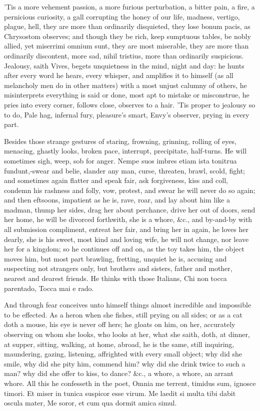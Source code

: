 {'Tis a more vehement passion, a more furious perturbation, a bitter
pain, a fire, a pernicious curiosity, a gall corrupting the honey of
our life, madness, vertigo, plague, hell, they are more than ordinarily
disquieted, they lose bonum pacis, as Chrysostom observes; and
though they be rich, keep sumptuous tables, be nobly allied, yet
miserrimi omnium sunt, they are most miserable, they are more than
ordinarily discontent, more sad, nihil tristius, more than ordinarily
suspicious. Jealousy, saith Vives, begets unquietness in the
mind, night and day: he hunts after every word he hears, every whisper,
and amplifies it to himself (as all melancholy men do in other matters)
with a most unjust calumny of others, he misinterprets everything is
said or done, most apt to mistake or misconstrue, he pries into every
corner, follows close, observes to a hair. 'Tis proper to jealousy so
to do,
Pale hag, infernal fury, pleasure's smart,
Envy's observer, prying in every part.

Besides those strange gestures of staring, frowning, grinning, rolling
of eyes, menacing, ghastly looks, broken pace, interrupt, precipitate,
half-turns. He will sometimes sigh, weep, sob for anger. Nempe suos
imbres etiam ista tonitrua fundunt,-swear and belie, slander any
man, curse, threaten, brawl, scold, fight; and sometimes again flatter
and speak fair, ask forgiveness, kiss and coll, condemn his rashness
and folly, vow, protest, and swear he will never do so again; and then
eftsoons, impatient as he is, rave, roar, and lay about him like a
madman, thump her sides, drag her about perchance, drive her out of
doors, send her home, he will be divorced forthwith, she is a whore,
\&c., and by-and-by with all submission compliment, entreat her fair,
and bring her in again, he loves her dearly, she is his sweet, most
kind and loving wife, he will not change, nor leave her for a kingdom;
so he continues off and on, as the toy takes him, the object moves him,
but most part brawling, fretting, unquiet he is, accusing and
suspecting not strangers only, but brothers and sisters, father and
mother, nearest and dearest friends. He thinks with those Italians,
Chi non tocca parentado,
Tocca mai e rado.

And through fear conceives unto himself things almost incredible and
impossible to be effected. As a heron when she fishes, still prying on
all sides; or as a cat doth a mouse, his eye is never off hers; he
gloats on him, on her, accurately observing on whom she looks, who
looks at her, what she saith, doth, at dinner, at supper, sitting,
walking, at home, abroad, he is the same, still inquiring, maundering,
gazing, listening, affrighted with every small object; why did she
smile, why did she pity him, commend him? why did she drink twice to
such a man? why did she offer to kiss, to dance? \&c., a whore, a whore,
an arrant whore. All this he confesseth in the poet,
Omnia me terrent, timidus sum, ignosce timori.
Et miser in tunica suspicor esse virum.
Me laedit si multa tibi dabit oscula mater,
Me soror, et cum qua dormit amica simul.

}
